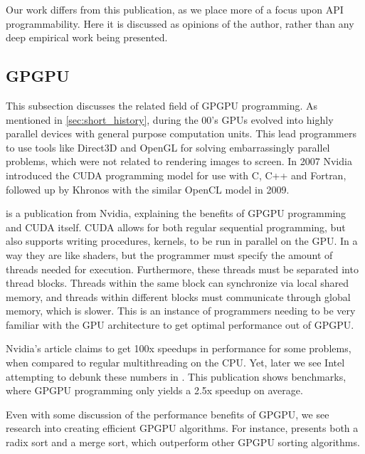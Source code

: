 Our work differs from this publication, as we place more of a focus upon \gls{API} programmability.
Here it is discussed as opinions of the author, rather than any deep empirical work being presented.

\subsection{\gls{GPGPU}}
This subsection discusses the related field of \gls{GPGPU} programming.
As mentioned in \cref{sec:short_history}, during the 00’s \glspl{GPU} evolved into highly parallel devices with general purpose computation units.
This lead programmers to use tools like Direct3D and OpenGL for solving embarrassingly parallel problems, which were not related to rendering images to screen.
In 2007 Nvidia introduced the CUDA programming model for use with C, C++ and Fortran, followed up by Khronos with the similar OpenCL model in 2009.


\citet{gpu_computing_era} is a publication from Nvidia, explaining the benefits of \gls{GPGPU} programming and CUDA itself. 
CUDA allows for both regular sequential programming, but also supports writing procedures, kernels, to be run in parallel on the \gls{GPU}.
In a way they are like shaders, but the programmer must specify the amount of threads needed for execution.
Furthermore, these threads must be separated into thread blocks.
Threads within the same block can synchronize via local shared memory, and threads within different blocks must communicate through global memory, which is slower.
This is an instance of programmers needing to be very familiar with the \gls{GPU} architecture to get optimal performance out of \gls{GPGPU}. 


Nvidia’s article claims to get 100x speedups in performance for some problems, when compared to regular multithreading on the \gls{CPU}.
Yet, later we see Intel attempting to debunk these numbers in \cite{lee_2010_debunking}.
This publication shows benchmarks, where \gls{GPGPU} programming only yields a 2.5x speedup on average.


Even with some discussion of the performance benefits of \gls{GPGPU}, we see research into creating efficient \gls{GPGPU} algorithms. 
For instance, \cite{satish_2009_designing} presents both a radix sort and a merge sort, which outperform other \gls{GPGPU} sorting algorithms.


